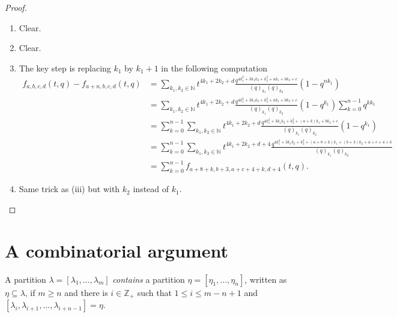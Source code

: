 \documentclass[a4paper, 12pt, reqno]{amsart}
\theoremstyle{remark}
\begin{document}
\begin{proof}\leavevmode
  \begin{enumerate}
  \item Clear.
  \item Clear.
  \item The key step is replacing $k_1$ by $k_1 + 1$ in the following computation
    \begin{align*}
      f_{a, b, c, d}(t, q) - f_{a + n, b, c, d}(t, q) &= \sum_{k_1, k_2 \in \mathbb{N}}t^{4k_1 + 2k_2 + d}\frac{q^{4k_1^2 + 3k_1k_2 + k_2^2 + ak_1 + bk_2 + c}}{(q)_{k_1}(q)_{k_2}}(1 - q^{nk_1}) \\
      &= \sum_{k_1, k_2 \in \mathbb{N}}t^{4k_1 + 2k_2 + d}\frac{q^{4k_1^2 + 3k_1k_2 + k_2^2 + ak_1 + bk_2 + c}}{(q)_{k_1}(q)_{k_2}}(1 - q^{k_1})\sum_{k = 0}^{n - 1}q^{kk_1} \\
      &= \sum_{k = 0}^{n - 1}\sum_{k_1, k_2 \in \mathbb{N}}t^{4k_1 + 2k_2 + d}\frac{q^{4k_1^2 + 3k_1k_2 + k_2^2 + (a + k)k_1 + bk_2 + c}}{(q)_{k_1}(q)_{k_2}}(1 - q^{k_1}) \\
      &= \sum_{k = 0}^{n - 1}\sum_{k_1, k_2 \in \mathbb{N}}t^{4k_1 + 2k_2 + d + 4}\frac{q^{4k_1^2 + 3k_1k_2 + k_2^2 + (a + 8 + k)k_1 + (b + 3)k_2 + a + c + 4 + k}}{(q)_{k_1}(q)_{k_2}} \\
      &= \sum_{k = 0}^{n - 1}f_{a + 8 + k, b + 3, a + c + 4 + k, d + 4}(t, q).
    \end{align*}
  \item Same trick as (iii) but with $k_2$ instead of $k_1$. \qedhere
  \end{enumerate}
\end{proof}

\section{A combinatorial argument}
\label{sec:comb-argum}

A partition $\lambda = [\lambda_1, \dots, \lambda_m]$ \emph{contains} a partition $\eta = [\eta_1, \dots, \eta_n]$, written as $\eta \subseteq \lambda$, if $m \ge n$ and there is $i \in \mathbb{Z}_+$ such that $1 \le i \le m - n + 1$ and $[\lambda_i, \lambda_{i + 1}, \dots, \lambda_{i + n - 1}] = \eta$.
\end{document}
